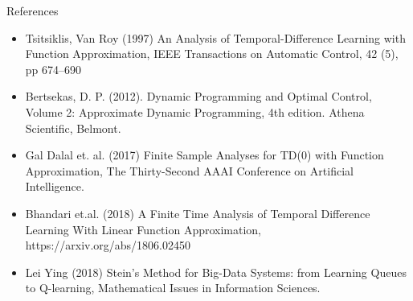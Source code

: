 \documentclass{beamer}
\begin{document}
\begin{frame}{References}

\begin{itemize}
  \item Tsitsiklis, Van Roy (1997) An Analysis of Temporal-Difference Learning
with Function Approximation, IEEE Transactions on Automatic Control, 42 (5), pp 674--690

\item Bertsekas, D. P. (2012). Dynamic Programming and Optimal Control, Volume 2:
Approximate Dynamic Programming, 4th edition. Athena Scientific, Belmont.


  \item Gal Dalal et. al. (2017) Finite Sample Analyses for TD(0) with Function Approximation, The Thirty-Second AAAI Conference
on Artificial Intelligence.


\item Bhandari et.al. (2018) A Finite Time Analysis of Temporal Difference Learning With Linear Function Approximation, https://arxiv.org/abs/1806.02450


\item Lei Ying (2018) Stein's Method for Big-Data Systems: from Learning Queues to Q-learning, Mathematical Issues in Information Sciences.
  \end{itemize}


\end{frame}
\end{document}
